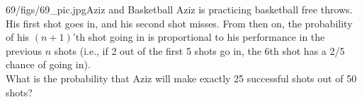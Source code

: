 \begin{problem}{69/figs/69_pic.jpg}{Aziz and Basketball} Aziz is practicing basketball free throws. His first shot goes in, and his second shot misses. From then on, the probability of his $(n+1)$'th shot going in is proportional to his performance in the previous $n$ shots (i.e., if 2 out of the first 5 shots go in, the 6th shot has a 2/5 chance of going in).\\[0.2cm]
	
What is the probability that Aziz will make exactly 25 successful shots out of 50 shots?
\end{problem}
